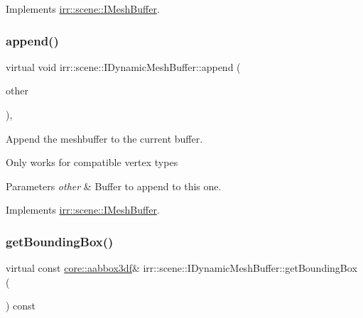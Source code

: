Implements \hyperlink{classirr_1_1scene_1_1IMeshBuffer_ac9e9d7fbb10175cc6f1596ba3fe4e8f9}{irr\+::scene\+::\+I\+Mesh\+Buffer}.

\mbox{\label{classirr_1_1scene_1_1IDynamicMeshBuffer_aada30374517d2a52d6264b6359a1e35c}} 
\subsubsection{\texorpdfstring{append()}{append()}\hspace{0.1cm}{\footnotesize\ttfamily [2/2]}}
{\footnotesize\ttfamily virtual void irr\+::scene\+::\+I\+Dynamic\+Mesh\+Buffer\+::append (\begin{DoxyParamCaption}\item[{const \hyperlink{classirr_1_1scene_1_1IMeshBuffer}{I\+Mesh\+Buffer} $\ast$const}]{other }\end{DoxyParamCaption})\hspace{0.3cm}{\ttfamily [inline]}, {\ttfamily [virtual]}}



Append the meshbuffer to the current buffer. 

Only works for compatible vertex types 
\begin{DoxyParams}{Parameters}
{\em other} & Buffer to append to this one. \\
\hline
\end{DoxyParams}


Implements \hyperlink{classirr_1_1scene_1_1IMeshBuffer_a79d2737962579138183ed0fd324310b3}{irr\+::scene\+::\+I\+Mesh\+Buffer}.

\mbox{\label{classirr_1_1scene_1_1IDynamicMeshBuffer_a9053baee5a13c8b51e306d99e5ef7427}} 
\subsubsection{\texorpdfstring{get\+Bounding\+Box()}{getBoundingBox()}}
{\footnotesize\ttfamily virtual const \hyperlink{namespaceirr_1_1core_adfc8fa01b30044c55f3332a1d6c1aa19}{core\+::aabbox3df}\& irr\+::scene\+::\+I\+Dynamic\+Mesh\+Buffer\+::get\+Bounding\+Box (\begin{DoxyParamCaption}{ }\end{DoxyParamCaption}) const\hspace{0.3cm}{\ttfamily [pure virtual]}}



